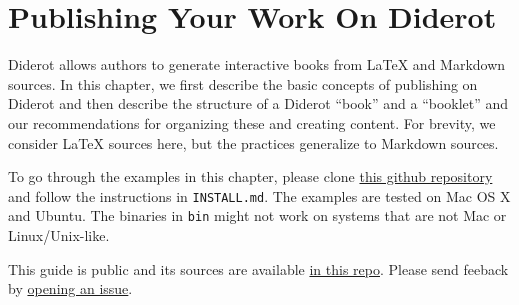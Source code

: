 \chapter{Publishing Your Work On Diderot}
\label{ch:publish}

\begin{gram}
Diderot allows authors to generate interactive books from LaTeX and Markdown sources.
%
In this chapter, we first describe the basic concepts of publishing on
Diderot and then describe the structure of a Diderot ``book'' and a ``booklet'' and our recommendations for organizing these and creating content.
%
For brevity, we consider LaTeX sources here, but the practices generalize to Markdown sources.
\end{gram}

\begin{important}
To go through the examples in this chapter, please clone 
%
\href{https://github.com/diderot-edu/diderot-guide}{this github repository}
%
and follow the instructions in \lstinline`INSTALL.md`. 
%
The examples are tested on Mac OS X and Ubuntu.  The binaries in \lstinline`bin` might not work on systems that are not Mac or Linux/Unix-like. 

This guide is public and its sources are available 
\href{https://github.com/diderot-edu/diderot-guide}{in this repo}.
%
Please send feeback by \href{https://github.com/diderot-edu/diderot-guide/issues}{opening an issue}.
\end{important}



